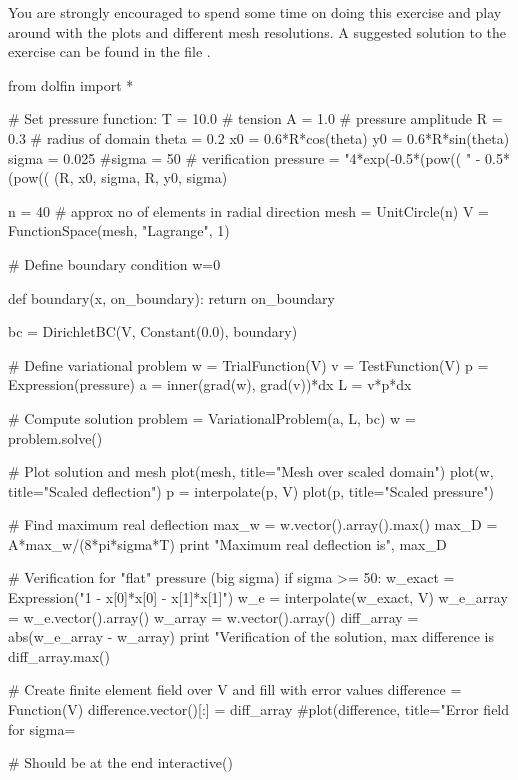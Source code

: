 You are strongly encouraged to spend some time on doing this exercise and
play around with the plots and different mesh resolutions.  A suggested
solution to the exercise can be found in the file .

\begin{python}
from dolfin import *

# Set pressure function:
T = 10.0  # tension
A = 1.0   # pressure amplitude
R = 0.3   # radius of domain
theta = 0.2
x0 = 0.6*R*cos(theta)
y0 = 0.6*R*sin(theta)
sigma = 0.025
#sigma = 50  # verification
pressure = "4*exp(-0.5*(pow((%
           "     - 0.5*(pow((%
           (R, x0, sigma, R, y0, sigma)

n = 40   # approx no of elements in radial direction
mesh = UnitCircle(n)
V = FunctionSpace(mesh, "Lagrange", 1)

# Define boundary condition w=0

def boundary(x, on_boundary):
    return on_boundary

bc = DirichletBC(V, Constant(0.0), boundary)

# Define variational problem
w = TrialFunction(V)
v = TestFunction(V)
p = Expression(pressure)
a = inner(grad(w), grad(v))*dx
L = v*p*dx

# Compute solution
problem = VariationalProblem(a, L, bc)
w = problem.solve()

# Plot solution and mesh
plot(mesh, title="Mesh over scaled domain")
plot(w, title="Scaled deflection")
p = interpolate(p, V)
plot(p, title="Scaled pressure")

# Find maximum real deflection
max_w = w.vector().array().max()
max_D = A*max_w/(8*pi*sigma*T)
print "Maximum real deflection is", max_D

# Verification for "flat" pressure (big sigma)
if sigma >= 50:
    w_exact = Expression("1 - x[0]*x[0] - x[1]*x[1]")
    w_e = interpolate(w_exact, V)
    w_e_array = w_e.vector().array()
    w_array = w.vector().array()
    diff_array = abs(w_e_array - w_array)
    print "Verification of the solution, max difference is %
          diff_array.max()

    # Create finite element field over V and fill with error values
    difference = Function(V)
    difference.vector()[:] = diff_array
    #plot(difference, title="Error field for sigma=%

# Should be at the end
interactive()
\end{python}

